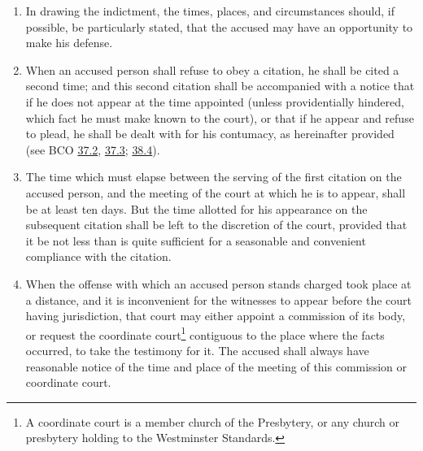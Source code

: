 \documentclass[
]{book}
\begin{document}
\begin{enumerate}
\item
  In drawing the indictment, the times, places, and circumstances should, if possible, be particularly stated, that the accused may have an opportunity to make his defense.
\item
  When an accused person shall refuse to obey a citation, he shall be cited a second time; and this second citation shall be accompanied with a notice that if he does not appear at the time appointed (unless providentially hindered, which fact he must make known to the court), or that if he appear and refuse to plead, he shall be dealt with for his contumacy, as hereinafter provided (see BCO \protect\hyperlink{37.2}{37.2}, \protect\hyperlink{37.3}{37.3}; \protect\hyperlink{38.4}{38.4}).
\item
  The time which must elapse between the serving of the first citation on the accused person, and the meeting of the court at which he is to appear, shall be at least ten days. But the time allotted for his appearance on the subsequent citation shall be left to the discretion of the court, provided that it be not less than is quite sufficient for a seasonable and convenient compliance with the citation.
\item
  \protect\hypertarget{36.8}{\href{}{}}When the offense with which an accused person stands charged took place at a distance, and it is inconvenient for the witnesses to appear before the court having jurisdiction, that court may either appoint a commission of its body, or request the coordinate court\footnote{A coordinate court is a member church of the Presbytery, or any church or presbytery holding to the Westminster Standards.} contiguous to the place where the facts occurred, to take the testimony for it. The accused shall always have reasonable notice of the time and place of the meeting of this commission or coordinate court.
\end{enumerate}
\end{document}
